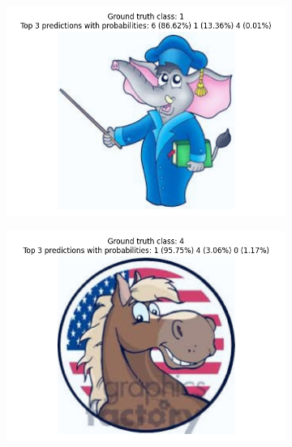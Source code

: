 \documentclass[a4paper,11pt]{article}
\begin{document}
\begin{figure}[ht]
    \centering
    \begin{subfigure}[b]{0.45\textwidth}
        \includegraphics[width=\textwidth]{../out/single_shot_full_model/error_0.png}
    \end{subfigure}
    \hfill
    \begin{subfigure}[b]{0.45\textwidth}
        \includegraphics[width=\textwidth]{../out/single_shot_full_model/error_1.png}
    \end{subfigure}
    \begin{subfigure}[b]{0.45\textwidth}

\end{subfigure}
\end{figure}
\end{document}
